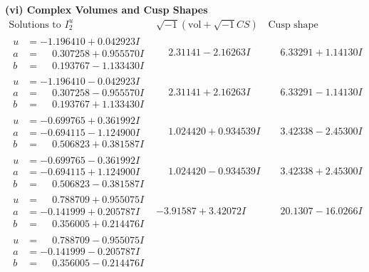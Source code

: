 \documentclass[1p]{elsarticle_modified}
\theoremstyle{definition}
\newcommand{\I}{\sqrt{-1}}
\begin{document}
\newpage\flushleft \textbf{(vi) Complex Volumes and Cusp Shapes}
$$\begin{array}{c|c|c}  
\text{Solutions to }I^u_{2}& \I (\text{vol} + \sqrt{-1}CS) & \text{Cusp shape}\\
 \hline 
\begin{aligned}
u &= -1.196410 + 0.042923 I \\
a &= \phantom{-}0.307258 + 0.955570 I \\
b &= \phantom{-}0.193767 - 1.133430 I\end{aligned}
 & \phantom{-}2.31141 - 2.16263 I & \phantom{-}6.33291 + 1.14130 I \\ \hline\begin{aligned}
u &= -1.196410 - 0.042923 I \\
a &= \phantom{-}0.307258 - 0.955570 I \\
b &= \phantom{-}0.193767 + 1.133430 I\end{aligned}
 & \phantom{-}2.31141 + 2.16263 I & \phantom{-}6.33291 - 1.14130 I \\ \hline\begin{aligned}
u &= -0.699765 + 0.361992 I \\
a &= -0.694115 - 1.124900 I \\
b &= \phantom{-}0.506823 + 0.381587 I\end{aligned}
 & \phantom{-}1.024420 + 0.934539 I & \phantom{-}3.42338 - 2.45300 I \\ \hline\begin{aligned}
u &= -0.699765 - 0.361992 I \\
a &= -0.694115 + 1.124900 I \\
b &= \phantom{-}0.506823 - 0.381587 I\end{aligned}
 & \phantom{-}1.024420 - 0.934539 I & \phantom{-}3.42338 + 2.45300 I \\ \hline\begin{aligned}
u &= \phantom{-}0.788709 + 0.955075 I \\
a &= -0.141999 + 0.205787 I \\
b &= \phantom{-}0.356005 + 0.214476 I\end{aligned}
 & -3.91587 + 3.42072 I & \phantom{-}20.1307 - 16.0266 I \\ \hline\begin{aligned}
u &= \phantom{-}0.788709 - 0.955075 I \\
a &= -0.141999 - 0.205787 I \\
b &= \phantom{-}0.356005 - 0.214476 I\end{aligned}

\end{array}$$
\end{document}
